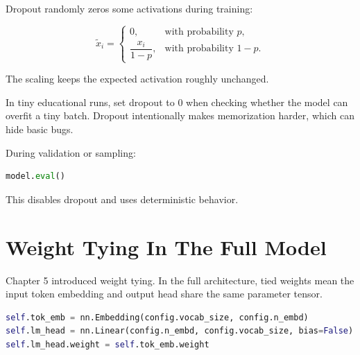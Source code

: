 Dropout randomly zeros some activations during training:

\[
\tilde{x}_i =
\begin{cases}
0, & \text{with probability }p,\\
\dfrac{x_i}{1-p}, & \text{with probability }1-p.
\end{cases}
\]

The scaling keeps the expected activation roughly unchanged.

\begin{center}
\end{center}

In tiny educational runs, set dropout to \(0\) when checking whether the model can overfit a tiny batch. Dropout intentionally makes memorization harder, which can hide basic bugs.

During validation or sampling:

\begin{lstlisting}[language=Python]
model.eval()
\end{lstlisting}

This disables dropout and uses deterministic behavior.

\section{Weight Tying In The Full Model}

Chapter 5 introduced weight tying. In the full architecture, tied weights mean the input token embedding and output head share the same parameter tensor.

\begin{lstlisting}[language=Python]
self.tok_emb = nn.Embedding(config.vocab_size, config.n_embd)
self.lm_head = nn.Linear(config.n_embd, config.vocab_size, bias=False)
self.lm_head.weight = self.tok_emb.weight
\end{lstlisting}

